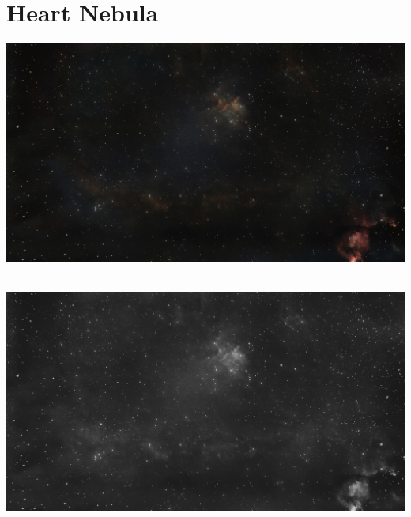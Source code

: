\ \\\section{Heart Nebula}
\includegraphics[width=\textwidth]{../Imaging//Original/Heart_Nebula.jpg}
{\footnotesize\color{white}


}\ \\
\includegraphics[width=\textwidth]{../Imaging//Grayscale/Heart_Nebula.jpg}
